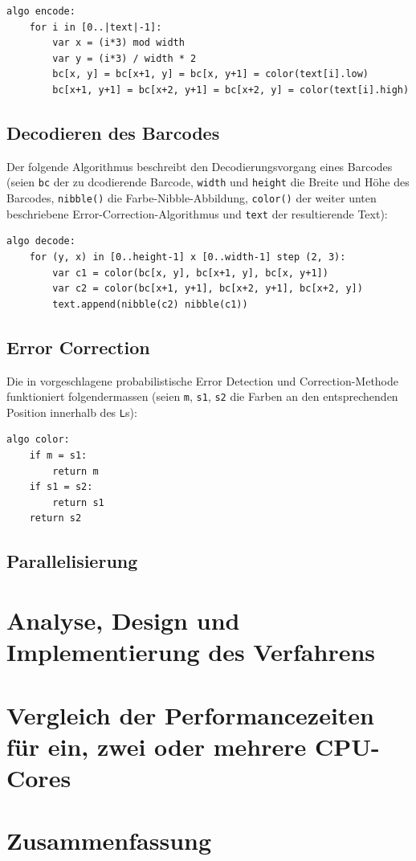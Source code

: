 \documentclass[11pt]{scrreprt} %
\theoremstyle{definition}
\begin{document}
\begin{verbatim}
algo encode:
    for i in [0..|text|-1]:
        var x = (i*3) mod width
        var y = (i*3) / width * 2
        bc[x, y] = bc[x+1, y] = bc[x, y+1] = color(text[i].low)
        bc[x+1, y+1] = bc[x+2, y+1] = bc[x+2, y] = color(text[i].high)
\end{verbatim}

\section{Decodieren des Barcodes}

Der folgende Algorithmus beschreibt den Decodierungsvorgang eines Barcodes (seien {\tt bc} der zu dcodierende Barcode, {\tt width} und {\tt height} die Breite und Höhe des Barcodes, {\tt nibble()} die Farbe-Nibble-Abbildung, {\tt color()} der weiter unten beschriebene Error-Correction-Algorithmus und {\tt text} der resultierende Text):

\begin{verbatim}
algo decode:
    for (y, x) in [0..height-1] x [0..width-1] step (2, 3):
        var c1 = color(bc[x, y], bc[x+1, y], bc[x, y+1])
        var c2 = color(bc[x+1, y+1], bc[x+2, y+1], bc[x+2, y])
        text.append(nibble(c2) nibble(c1))
\end{verbatim}

\section{Error Correction}

Die in \cite{paper} vorgeschlagene probabilistische Error Detection und Correction-Methode funktioniert folgendermassen (seien {\tt m}, {\tt s1}, {\tt s2} die Farben an den entsprechenden Position innerhalb des {\tt L}s):

\begin{verbatim}
algo color:
    if m = s1:
        return m
    if s1 = s2:
        return s1
    return s2
\end{verbatim}

\section{Parallelisierung}




\chapter{Analyse, Design und Implementierung des Verfahrens}
\label{sec:analyse}

\chapter{Vergleich der Performancezeiten für ein, zwei oder mehrere CPU-Cores}

\chapter{Zusammenfassung}




\listoffigures
\listoftables
\end{document}
